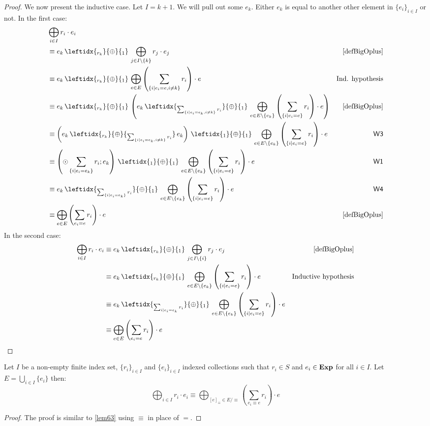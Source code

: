 \documentclass[a4paper,UKenglish,cleveref, autoref, thm-restate]{lipics-v2021}
\newcommand{\Exp}{\textbf{\upshape{Exp}}}
\newcommand{\WC}[2]{\,\leftidx{_{#1}}{{\oplus}}{_{#2}}\,}
\newcommand{\Ax}[1]{\ensuremath{\mathsf{#1}}}
\theoremstyle{plain}\newtheoremrep{thm}{Theorem}[section]
\begin{document}
\begin{toappendix}
\begin{proof}
			We now present the inductive case. Let $I = k+1$. We will pull out some $e_k$. Either $e_k$ is equal to another other element in $\{e_i\}_{i \in I}$ or not. In the first case:
			\begin{align*}
				&\bigoplus_{i \in I} r_i\cdot e_i \\
				&\equiv e_k \WC{r_k}{1}\bigoplus_{j \in I \setminus \{k\}}r_j\cdot e_j&\cref{defBigOplus}\\
				&\equiv e_k \WC{r_k}{1}\bigoplus_{e \in E}\left(\sum_{\{i \mid e_i=e, i \neq k\}}r_i\right)\cdot e&\text{Ind. hypothesis}\\
				&\equiv e_k \WC{r_k}{1}\left(e_k \WC{\sum_{\{i \mid e_i=e_k, i \neq k\}} r_ i}{1} \bigoplus_{e \in E \setminus \{e_k\}}\left(\sum_{\{i \mid e_i=e\}}r_i\right)\cdot e\right)&\cref{defBigOplus}\\
				&\equiv \left( e_k \WC{r_k}{\sum_{\{i \mid e_i=e_k, i \neq k\}} r_ i}e_k \right) \WC{1}{1} \bigoplus_{e \in E \setminus \{e_k\}}\left(\sum_{\{i \mid e_i=e\}}r_i\right)\cdot e&\Ax{W3}\\
				&\equiv \left( \odot \sum_{\{i \mid e_i=e_k\}} r_i;  e_k\right) \WC{1}{1} \bigoplus_{e \in E \setminus \{e_k\}}\left(\sum_{\{i \mid e_i=e\}}r_i\right)\cdot e&\Ax{W1}\\
				&\equiv e_k \WC{\sum_{\{i \mid e_i=e_k\}} r_i}{1} \bigoplus_{e \in E \setminus \{e_k\}}\left(\sum_{\{i \mid e_i=e\}}r_i\right)\cdot e& \Ax{W4}\\
				&\equiv \bigoplus_{e \in E}\left(\sum_{e_i=e}r_i\right)\cdot e&\cref{defBigOplus}
			\end{align*}
			In the second case:
			\begin{align*}
				\bigoplus_{i \in I} r_i\cdot e_i &\equiv e_k \WC{r_k}{1}\bigoplus_{j \in I \setminus \{i\}}r_j\cdot e_j&\cref{defBigOplus}\\
				&\equiv e_k \WC{r_k}{1}\bigoplus_{e \in E \setminus \{e_k\}}\left(\sum_{\{i \mid e_i=e\}}r_i\right)\cdot e&\text{Inductive hypothesis}\\
				&\equiv e_k \WC{\sum_{i \mid e_i=e_k}r_i}{1}\bigoplus_{e \in E \setminus \{e_k\}}\left(\sum_{\{i \mid e_i=e\}}r_i\right)\cdot e&\\
				&\equiv \bigoplus_{e \in E}\left(\sum_{e_i=e}r_i\right)\cdot e&\rlap{\qedhere} 
			\end{align*} 
		\end{proof}
		\begin{lem}
			Let $I$ be a non-empty finite index set, $\{r_i\}_{i \in I}$ and $\{e_i\}_{i \in I}$ indexed collections such that $r_i \in S$ and $e_i \in \Exp$ for all $i \in I$. Let $E = \bigcup_{i \in I}\{e_i\}$ then: 
			$$\bigoplus_{i\in I}r_i\cdot e_i \equiv \bigoplus_{[e]_\equiv \in E/\equiv}\left(\sum_{e_i \equiv e} r_i\right)\cdot e$$
			\label{lem64}
		\end{lem}
		\begin{proof}
			The proof is similar to \cref{lem63} using $\equiv$ in place of $=$.
		\end{proof}
	\end{toappendix}
\end{document}
